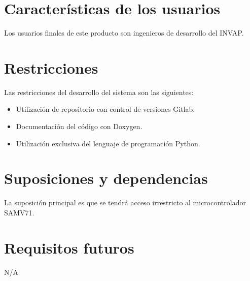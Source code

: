 \section{Características de los usuarios}

Los usuarios finales de este producto son ingenieros de desarrollo del INVAP.

\section{Restricciones}

Las restricciones del desarrollo del sistema son las siguientes:

\begin{itemize}
	\item Utilización de repositorio con control de versiones Gitlab.
	\item Documentación del código con Doxygen.
	\item Utilización exclusiva del lenguaje de programación Python.
\end{itemize}

\section{Suposiciones y dependencias}

La suposición principal es que se tendrá acceso irrestricto al microcontrolador SAMV71.

\section{Requisitos futuros}

N/A